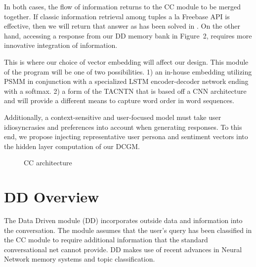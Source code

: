 \documentclass[10pt,twoside,twocolumn]{article}
\begin{document}
\noindent
In both cases, the flow of information returns to the CC module to be merged together. If classic information retrieval among tuples a la Freebase API is effective, then we will return that answer as has been solved in \cite{Iyyer2014, Yao2014a, Yao2014b}. On the other hand, accessing a response from our DD memory bank in Figure~2, requires more innovative integration of information.

\noindent
This is where our choice of vector embedding will affect our design. This module of the program will be one of two possibilities. 1) an in-house embedding utilizing PSMM \cite{Merity2016} in conjunction with a specialized LSTM encoder-decoder network ending with a softmax. 2) a form of the TACNTN \cite{Wu} that is based off a CNN architecture and will provide a different means to capture word order in word sequences.

\noindent
Additionally, a context-sensitive and user-focused model must take user idiosyncrasies and preferences into account when generating responses. To this end, we propose injecting representative user persona and sentiment vectors into the hidden layer computation of our DCGM. 

\begin{figure}[H]
    \centering
    
    \label{CCdesign}
    \caption{CC architecture}
\end{figure}

\section{DD Overview}
The Data Driven module (DD) incorporates outside data and information into the conversation. The module assumes that the user's query has been classified in the CC module to require additional information that the standard conversational net cannot provide. DD makes use of recent advances in Neural Network memory systems and topic classification.
\end{document}
